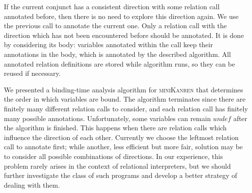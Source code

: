 \documentclass[submission,copyright,creativecommons]{eptcs}
\newcommand{\miniKanren}{\textsc{miniKanren}}
\begin{document}
If the current conjunct has a consistent direction with some relation call annotated before, then there is no need to explore this direction again.
We use the previous call to annotate the current one.
Only a relation call with the direction which has not been encountered before should be annotated.
It is done by considering its body: variables annotated within the call keep their annotations in the body, which is annotated by the described algorithm.
All annotated relation definitions are stored while algorithm runs, so they can be reused if necessary.

We presented a binding-time analysis algorithm for \miniKanren{} that determines the order in which variables are bound.
The algorithm terminates since there are finitely many different relation calls to consider, and each relation call has finitely many possible annotations.
Unfortunately, some variables can remain $undef$ after the algorithm is finished.
This happens when there are relation calls which influence the direction of each other.
Currently we choose the leftmost relation call to annotate first; while another, less efficient but more fair, solution may be to consider all possible combinations of directions.
In our experience, this problem rarely arises in the context of relational interpreters, but we should further investigate the class of such programs and develop a better strategy of dealing with them.



\nocite{*}


\end{document}
